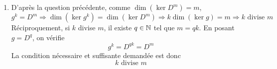 \begin{enumerate}
\begin{enumerate}
\item L'application $\Phi$ est lin{\'e}aire car c'est la restriction de $g$ à $\ker g^p$. Elle prend ses valeurs dans $\ker g^{q-1}$ car
\begin{displaymath}
  \forall x\in E, \; x\in \ker g^p \Rightarrow 0_E = g^p(x)=g^{p-1}(g(x)) \Rightarrow g(x)\in \ker g^{p-1}
\end{displaymath}
Montrons la surjectivit{\'e} de $\Phi$.\newline
Soit $x\in \ker g^{p-1}$. Comme $g$ est surjective, il existe un $y\in E$ tel que $x=g(y)$ et
\begin{displaymath}
0_E = g^{p-1}(x) = g^{p-1}(g(y)) = g^p(y)  
\end{displaymath}
donc $y\in \ker g^p$ et $y$ est un ant{\'e}c{\'e}dent par $\Phi$ de $x$.\newline
Ainsi $\Phi$ est surjective de $\ker g^p$ vers $\ker g^{p-1}$ de noyau $\ker g$. Le th{\'e}or{\`e}me du rang donne alors
\begin{displaymath}
\dim(\ker g^p) = \dim(\ker g^{p-1}) + \dim(\ker g)  
\end{displaymath}
La suite des dimensions est arithm{\'e}tique d'o{\`u}
\begin{displaymath}
\dim(\ker g^p)=p\dim(\ker g)
\end{displaymath}
     \end{enumerate}

  \item D'après la question précédente, comme $\dim(\ker D^m)=m$,
\begin{displaymath}
  g^k = D^m \Rightarrow
\dim (\ker g^k) = \dim (\ker D^m) \Rightarrow k\dim(\ker g) = m \Rightarrow k \text{ divise } m
\end{displaymath}
Réciproquement, si $k$ divise $m$, il existe $q\in \mathbb{N}$ tel que $m=qk$. En posant $g = D^q$, on vérifie
\begin{displaymath}
  g^k = D^{qk} = D^m
\end{displaymath}
La condition nécessaire et suffisante demandée est donc
\begin{displaymath}
  k \text{ divise } m
\end{displaymath}

\end{enumerate}

